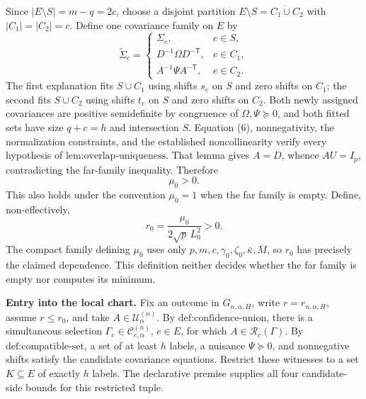Since \(|E\setminus S|=m-q=2c\), choose a disjoint partition \(E\setminus S=C_1\mathbin{\dot\cup}C_2\) with \(|C_1|=|C_2|=c\). Define one covariance family on \(E\) by
\[
\widetilde\Sigma_e=
\begin{cases}
\Sigma_e,&e\in S,\\
D^{-1}\Omega D^{-\mathsf T},&e\in C_1,\\
A^{-1}\Psi A^{-\mathsf T},&e\in C_2.
\end{cases}
\]
The first explanation fits \(S\cup C_1\) using shifts \(s_e\) on \(S\) and zero shifts on \(C_1\); the second fits \(S\cup C_2\) using shifts \(t_e\) on \(S\) and zero shifts on \(C_2\). Both newly assigned covariances are positive semidefinite by congruence of \(\Omega,\Psi\succeq0\), and both fitted sets have size \(q+c=h\) and intersection \(S\). Equation (6), nonnegativity, the normalization constraints, and the established noncollinearity verify every hypothesis of \(\text{lem:overlap-uniqueness}\). That lemma gives \(A=D\), whence \(AU=I_p\), contradicting the far-family inequality. Therefore
\[
\mu_0>0.
\tag{7}
\]
This also holds under the convention \(\mu_0=1\) when the far family is empty. Define, non-effectively,
\[
r_0=\frac{\mu_0}{2\sqrt p\,L_0^2}>0.
\tag{8}
\]
The compact family defining \(\mu_0\) uses only \(p,m,c,\gamma_0,\zeta_0,\overline\kappa,\overline M\), so \(r_0\) has precisely the claimed dependence. This definition neither decides whether the far family is empty nor computes its minimum.

\textbf{Entry into the local chart.}
Fix an outcome in \(G_{n,\alpha,H}\), write \(r=r_{n,\alpha,H}\), assume \(r\leq r_0\), and take \(A\in\mathcal U^{(n)}_\alpha\). By \(\text{def:confidence-union}\), there is a simultaneous selection \(\Gamma_e\in\mathcal C^{(n)}_{e,\alpha}\), \(e\in E\), for which \(A\in\mathcal R_c(\Gamma)\). By \(\text{def:compatible-set}\), a set of at least \(h\) labels, a nuisance \(\Psi\succeq0\), and nonnegative shifts satisfy the candidate covariance equations. Restrict these witnesses to a set \(K\subseteq E\) of exactly \(h\) labels. The declarative premise supplies all four candidate-side bounds for this restricted tuple.

